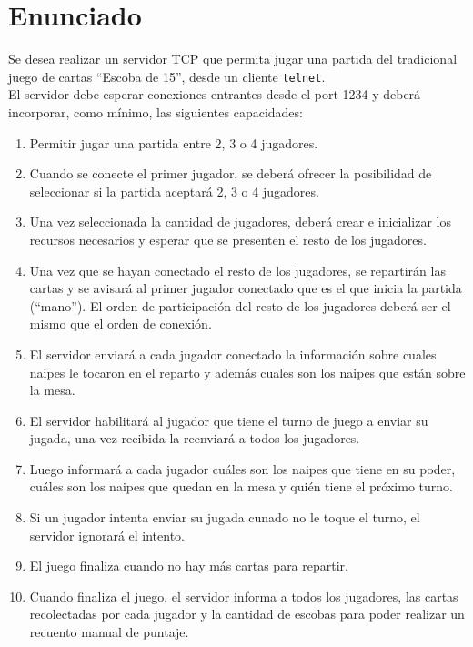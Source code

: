 \section{Enunciado}

Se desea realizar un servidor TCP que permita jugar una partida del tradicional juego de cartas ``Escoba de 15'', desde un cliente \texttt{telnet}.\\

El servidor debe esperar conexiones entrantes desde el port 1234 y deberá incorporar, como mínimo, las siguientes capacidades:\\

\begin{enumerate}[label=\alph*)]\bfseries
    \item \textnormal{Permitir jugar una partida entre 2, 3 o 4 jugadores.}
    \item \textnormal{Cuando se conecte el primer jugador, se deberá ofrecer la posibilidad de seleccionar si la partida aceptará 2, 3 o 4 jugadores.}
    \item \textnormal{Una vez seleccionada la cantidad de jugadores, deberá crear e inicializar los recursos necesarios y esperar que se presenten el resto de los jugadores.}
    \item \textnormal{Una vez que se hayan conectado el resto de los jugadores, se repartirán las cartas y se avisará al primer jugador conectado que es el que inicia la partida (``mano''). El orden de participación del resto de los jugadores deberá ser el mismo que el orden de conexión.}
    \item \textnormal{El servidor enviará a cada jugador conectado la información sobre cuales naipes le tocaron en el reparto y además cuales son los naipes que están sobre la mesa.}
    \item \textnormal{El servidor habilitará al jugador que tiene el turno de juego a enviar su jugada, una vez recibida la reenviará a todos los jugadores.}
    \item \textnormal{Luego informará a cada jugador cuáles son los naipes que tiene en su poder, cuáles son los naipes que quedan en la mesa y quién tiene el próximo turno.}
    \item \textnormal{Si un jugador intenta enviar su jugada cunado no le toque el turno, el servidor ignorará el intento.}
    \item \textnormal{El juego finaliza cuando no hay más cartas para repartir.}
    \item \textnormal{Cuando finaliza el juego, el servidor informa a todos los jugadores, las cartas recolectadas por cada jugador y la cantidad de escobas para poder realizar un recuento manual de puntaje.}\\
\end{enumerate}

